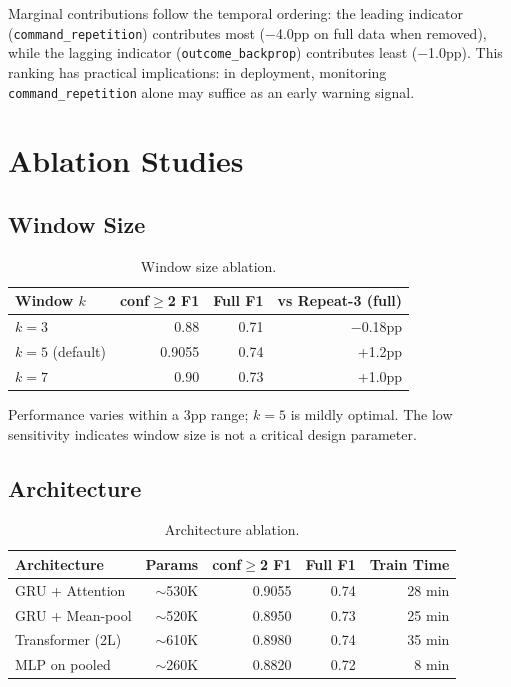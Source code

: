 \documentclass[11pt]{article}
\begin{document}
Marginal contributions follow the temporal ordering: the leading indicator (\texttt{command\_repetition}) contributes most ($-$4.0pp on full data when removed), while the lagging indicator (\texttt{outcome\_backprop}) contributes least ($-$1.0pp).
This ranking has practical implications: in deployment, monitoring \texttt{command\_repetition} alone may suffice as an early warning signal.

\section{Ablation Studies}
\label{sec:ablations}

\subsection{Window Size}
\label{sec:ablation_window}

\begin{table}[h]
\centering
\caption{Window size ablation.}
\label{tab:window_size}
\begin{tabular}{lrrr}
\toprule
\textbf{Window $k$} & \textbf{conf$\geq$2 F1} & \textbf{Full F1} & \textbf{vs Repeat-3 (full)} \\
\midrule
$k\!=\!3$ & 0.88 & 0.71 & $-$0.18pp \\
$k\!=\!5$ (default) & 0.9055 & 0.74 & +1.2pp \\
$k\!=\!7$ & 0.90 & 0.73 & +1.0pp \\
\bottomrule
\end{tabular}
\end{table}

Performance varies within a 3pp range; $k\!=\!5$ is mildly optimal.
The low sensitivity indicates window size is not a critical design parameter.

\subsection{Architecture}
\label{sec:ablation_arch}

\begin{table}[h]
\centering
\caption{Architecture ablation.}
\label{tab:architecture}
\begin{tabular}{lrrrr}
\toprule
\textbf{Architecture} & \textbf{Params} & \textbf{conf$\geq$2 F1} & \textbf{Full F1} & \textbf{Train Time} \\
\midrule
GRU + Attention & $\sim$530K & 0.9055 & 0.74 & 28 min \\
GRU + Mean-pool & $\sim$520K & 0.8950 & 0.73 & 25 min \\
Transformer (2L) & $\sim$610K & 0.8980 & 0.74 & 35 min \\
MLP on pooled & $\sim$260K & 0.8820 & 0.72 & 8 min \\
\bottomrule
\end{tabular}
\end{table}
\end{document}
